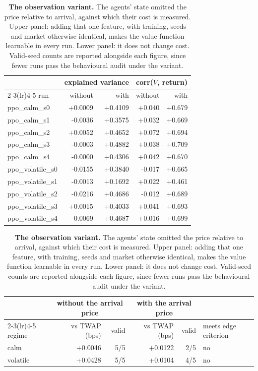 \begin{table}[htbp]\centering
\caption[The observation variant]{\textbf{The observation variant.} The agents' state omitted
the price relative to arrival, against which their cost is measured. Upper panel: adding that
one feature, with training, seeds and market otherwise identical, makes the value function
learnable in every run. Lower panel: it does not change cost. Valid-seed counts are reported
alongside each figure, since fewer runs pass the behavioural audit under the variant.}
\label{tab:sigext-a4}
\small
\begin{tabular}{lrrrr}
\toprule
& \multicolumn{2}{c}{explained variance} & \multicolumn{2}{c}{corr($V$, return)} \\
\cmidrule(lr){2-3}\cmidrule(lr){4-5}
run & without & with & without & with \\
\midrule
ppo\_calm\_s0 & +0.0009 & +0.4109 & +0.040 & +0.679 \\
ppo\_calm\_s1 & -0.0036 & +0.3575 & +0.032 & +0.669 \\
ppo\_calm\_s2 & +0.0052 & +0.4652 & +0.072 & +0.694 \\
ppo\_calm\_s3 & -0.0003 & +0.4882 & +0.038 & +0.709 \\
ppo\_calm\_s4 & -0.0000 & +0.4306 & +0.042 & +0.670 \\
ppo\_volatile\_s0 & -0.0155 & +0.3840 & -0.017 & +0.665 \\
ppo\_volatile\_s1 & -0.0013 & +0.1692 & +0.022 & +0.461 \\
ppo\_volatile\_s2 & -0.0216 & +0.4686 & -0.012 & +0.689 \\
ppo\_volatile\_s3 & +0.0015 & +0.4033 & +0.041 & +0.693 \\
ppo\_volatile\_s4 & -0.0069 & +0.4687 & +0.016 & +0.699 \\
\bottomrule
\end{tabular}

\vspace{0.6em}
\begin{tabular}{lrrrrl}
\toprule
& \multicolumn{2}{c}{without the arrival price} & \multicolumn{2}{c}{with the arrival price} & \\
\cmidrule(lr){2-3}\cmidrule(lr){4-5}
regime & vs TWAP (bps) & valid & vs TWAP (bps) & valid & meets edge criterion \\
\midrule
calm & +0.0046 & 5/5 & +0.0122 & 2/5 & no \\
volatile & +0.0428 & 5/5 & +0.0104 & 4/5 & no \\
\bottomrule
\end{tabular}
\end{table}

